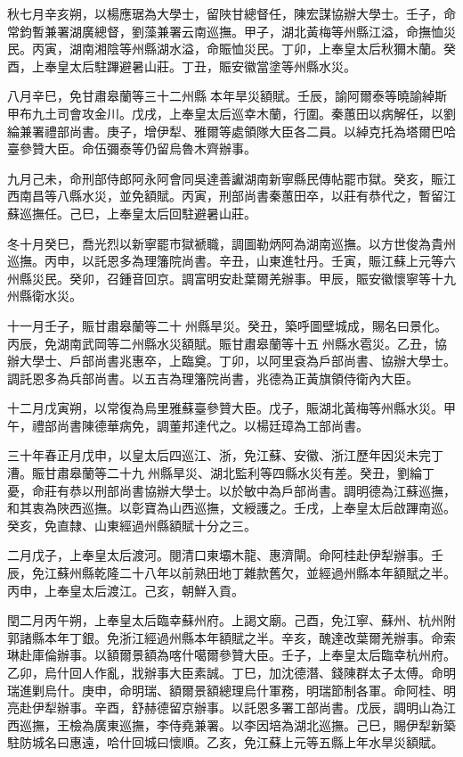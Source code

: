 \begin{pinyinscope}
秋七月辛亥朔，以楊應琚為大學士，留陜甘總督任，陳宏謀協辦大學士。壬子，命常鈞暫兼署湖廣總督，劉藻兼署云南巡撫。甲子，湖北黃梅等州縣江溢，命撫恤災民。丙寅，湖南湘陰等州縣湖水溢，命賑恤災民。丁卯，上奉皇太后秋獮木蘭。癸酉，上奉皇太后駐蹕避暑山莊。丁丑，賑安徽當塗等州縣水災。

八月辛巳，免甘肅皋蘭等三十二州縣本年旱災額賦。壬辰，諭阿爾泰等曉諭綽斯甲布九土司會攻金川。戊戌，上奉皇太后巡幸木蘭，行圍。秦蕙田以病解任，以劉綸兼署禮部尚書。庚子，增伊犁、雅爾等處領隊大臣各二員。以綽克托為塔爾巴哈臺參贊大臣。命伍彌泰等仍留烏魯木齊辦事。

九月己未，命刑部侍郎阿永阿會同吳達善讞湖南新寧縣民傳帖罷市獄。癸亥，賑江西南昌等八縣水災，並免額賦。丙寅，刑部尚書秦蕙田卒，以莊有恭代之，暫留江蘇巡撫任。己巳，上奉皇太后回駐避暑山莊。

冬十月癸巳，喬光烈以新寧罷市獄褫職，調圖勒炳阿為湖南巡撫。以方世俊為貴州巡撫。丙申，以託恩多為理籓院尚書。辛丑，山東進牡丹。壬寅，賑江蘇上元等六州縣災民。癸卯，召鍾音回京。調富明安赴葉爾羌辦事。甲辰，賑安徽懷寧等十九州縣衛水災。

十一月壬子，賑甘肅皋蘭等二十州縣旱災。癸丑，築呼圖壁城成，賜名曰景化。丙辰，免湖南武岡等二州縣水災額賦。賑甘肅皋蘭等十五州縣水雹災。乙丑，協辦大學士、戶部尚書兆惠卒，上臨奠。丁卯，以阿里袞為戶部尚書、協辦大學士。調託恩多為兵部尚書。以五吉為理籓院尚書，兆德為正黃旗領侍衛內大臣。

十二月戊寅朔，以常復為烏里雅蘇臺參贊大臣。戊子，賑湖北黃梅等州縣水災。甲午，禮部尚書陳德華病免，調董邦達代之。以楊廷璋為工部尚書。

三十年春正月戊申，以皇太后四巡江、浙，免江蘇、安徽、浙江歷年因災未完丁漕。賑甘肅皋蘭等二十九州縣旱災、湖北監利等四縣水災有差。癸丑，劉綸丁憂，命莊有恭以刑部尚書協辦大學士。以於敏中為戶部尚書。調明德為江蘇巡撫，和其衷為陜西巡撫。以彰寶為山西巡撫，文綬護之。壬戌，上奉皇太后啟蹕南巡。癸亥，免直隸、山東經過州縣額賦十分之三。

二月戊子，上奉皇太后渡河。閱清口東壩木龍、惠濟閘。命阿桂赴伊犁辦事。壬辰，免江蘇州縣乾隆二十八年以前熟田地丁雜款舊欠，並經過州縣本年額賦之半。丙申，上奉皇太后渡江。己亥，朝鮮入貢。

閏二月丙午朔，上奉皇太后臨幸蘇州府。上謁文廟。己酉，免江寧、蘇州、杭州附郭諸縣本年丁銀。免浙江經過州縣本年額賦之半。辛亥，醜達改葉爾羌辦事。命索琳赴庫倫辦事。以額爾景額為喀什噶爾參贊大臣。壬子，上奉皇太后臨幸杭州府。乙卯，烏什回人作亂，戕辦事大臣素誠。丁巳，加沈德潛、錢陳群太子太傅。命明瑞進剿烏什。庚申，命明瑞、額爾景額總理烏什軍務，明瑞節制各軍。命阿桂、明亮赴伊犁辦事。辛酉，舒赫德留京辦事。以託恩多署工部尚書。戊辰，調明山為江西巡撫，王檢為廣東巡撫，李侍堯兼署。以李因培為湖北巡撫。己巳，賜伊犁新築駐防城名曰惠遠，哈什回城曰懷順。乙亥，免江蘇上元等五縣上年水旱災額賦。


\end{pinyinscope}
